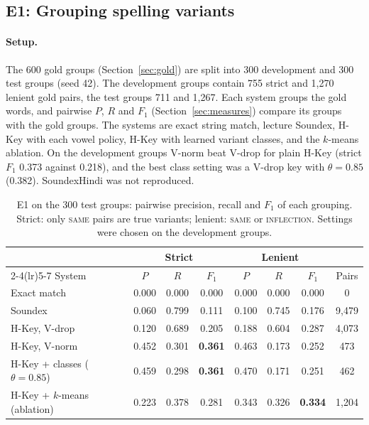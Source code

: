 
\subsection{E1: Grouping spelling variants}
\label{sec:e1}

\paragraph{Setup.} The 600 gold groups (Section~\ref{sec:gold}) are split into 300 development and
300 test groups (seed 42). The development groups contain 755 strict and 1{,}270 lenient gold pairs,
the test groups 711 and 1{,}267. Each system groups the gold words, and pairwise $P$, $R$ and $F_1$
(Section~\ref{sec:measures}) compare its groups with the gold groups. The systems are exact string
match, lecture Soundex, H-Key with each vowel policy, H-Key with learned variant classes, and the
$k$-means ablation. On the development groups V-norm beat V-drop for plain H-Key (strict $F_1$
0.373 against 0.218), and the best class setting was a V-drop key with $\theta=0.85$ (0.382).
SoundexHindi \citep{kant2020soundexhindi} was not reproduced.

\begin{table}[t]
\centering
\caption{E1 on the 300 test groups: pairwise precision, recall and $F_1$ of each grouping. Strict:
only \textsc{same} pairs are true variants; lenient: \textsc{same} or \textsc{inflection}. Settings
were chosen on the development groups.}
\label{tab:e1}
\small
\begin{tabular}{@{}lccccccc@{}}
\toprule
 & \multicolumn{3}{c}{Strict} & \multicolumn{3}{c}{Lenient} & \\
\cmidrule(lr){2-4}\cmidrule(lr){5-7}
System & $P$ & $R$ & $F_1$ & $P$ & $R$ & $F_1$ & Pairs \\
\midrule
Exact match & 0.000 & 0.000 & 0.000 & 0.000 & 0.000 & 0.000 & 0 \\
Soundex & 0.060 & 0.799 & 0.111 & 0.100 & 0.745 & 0.176 & 9{,}479 \\
H-Key, V-drop & 0.120 & 0.689 & 0.205 & 0.188 & 0.604 & 0.287 & 4{,}073 \\
H-Key, V-norm & 0.452 & 0.301 & \textbf{0.361} & 0.463 & 0.173 & 0.252 & 473 \\
H-Key + classes ($\theta=0.85$) & 0.459 & 0.298 & \textbf{0.361} & 0.470 & 0.171 & 0.251 & 462 \\
H-Key + $k$-means (ablation) & 0.223 & 0.378 & 0.281 & 0.343 & 0.326 & \textbf{0.334} & 1{,}204 \\
\bottomrule
\end{tabular}
\end{table}


